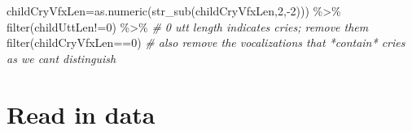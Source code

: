 \documentclass[
]{article}
\newenvironment{Shaded}{\begin{snugshade}}{\end{snugshade}}
\newcommand{\AttributeTok}[1]{\textcolor[rgb]{0.77,0.63,0.00}{#1}}
\newcommand{\CommentTok}[1]{\textcolor[rgb]{0.56,0.35,0.01}{\textit{#1}}}
\newcommand{\DecValTok}[1]{\textcolor[rgb]{0.00,0.00,0.81}{#1}}
\newcommand{\FunctionTok}[1]{\textcolor[rgb]{0.00,0.00,0.00}{#1}}
\newcommand{\NormalTok}[1]{#1}
\newcommand{\SpecialCharTok}[1]{\textcolor[rgb]{0.00,0.00,0.00}{#1}}
\newcommand{\StringTok}[1]{\textcolor[rgb]{0.31,0.60,0.02}{#1}}
\begin{document}
\begin{Shaded}
\begin{Highlighting}[]
         \AttributeTok{childCryVfxLen=}\FunctionTok{as.numeric}\NormalTok{(}\FunctionTok{str\_sub}\NormalTok{(childCryVfxLen,}\DecValTok{2}\NormalTok{,}\SpecialCharTok{{-}}\DecValTok{2}\NormalTok{))) }\SpecialCharTok{\%\textgreater{}\%}
  \FunctionTok{filter}\NormalTok{(childUttLen}\SpecialCharTok{!=}\StringTok{\textquotesingle{}0\textquotesingle{}}\NormalTok{) }\SpecialCharTok{\%\textgreater{}\%} \CommentTok{\# 0 utt length indicates cries; remove them}
  \FunctionTok{filter}\NormalTok{(childCryVfxLen}\SpecialCharTok{==}\StringTok{\textquotesingle{}0\textquotesingle{}}\NormalTok{) }\CommentTok{\# also remove the vocalizations that *contain* cries as we can\textquotesingle{}t distinguish}
\end{Highlighting}
\end{Shaded}

\hypertarget{read-in-data}{%
\section{Read in data}\label{read-in-data}}
\end{document}
